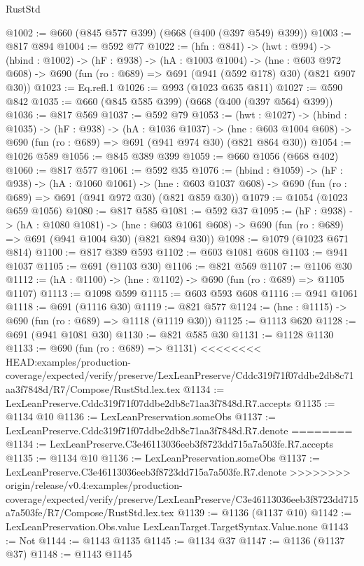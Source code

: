 \begin{lexlean}{RustStd}
\begin{coremodule}
{\begin{coremodule}
@1002 := @660 (@845 @577 @399) (@668 (@400 (@397 @549) @399))
@1003 := @817 @894
@1004 := @592 @77
@1022 := (hfn : @841) ->
  (hwt : @994) ->
  (hbind : @1002) ->
  (hF : @938) ->
  (hA : @1003 @1004) ->
  (hne : @603 @972 @608) -> @690 (fun (ro : @689) => @691 (@941 (@592 @178) @30) (@821 @907 @30))
@1023 := Eq.refl.{1}
@1026 := @993 (@1023 @635 @811)
@1027 := @590 @842
@1035 := @660 (@845 @585 @399) (@668 (@400 (@397 @564) @399))
@1036 := @817 @569
@1037 := @592 @79
@1053 := (hwt : @1027) ->
  (hbind : @1035) ->
  (hF : @938) ->
  (hA : @1036 @1037) ->
  (hne : @603 @1004 @608) -> @690 (fun (ro : @689) => @691 (@941 @974 @30) (@821 @864 @30))
@1054 := @1026 @589
@1056 := @845 @389 @399
@1059 := @660 @1056 (@668 @402)
@1060 := @817 @577
@1061 := @592 @35
@1076 := (hbind : @1059) ->
  (hF : @938) ->
  (hA : @1060 @1061) ->
  (hne : @603 @1037 @608) -> @690 (fun (ro : @689) => @691 (@941 @972 @30) (@821 @859 @30))
@1079 := @1054 (@1023 @659 @1056)
@1080 := @817 @585
@1081 := @592 @37
@1095 := (hF : @938) ->
  (hA : @1080 @1081) ->
  (hne : @603 @1061 @608) -> @690 (fun (ro : @689) => @691 (@941 @1004 @30) (@821 @894 @30))
@1098 := @1079 (@1023 @671 @814)
@1100 := @817 @389 @593
@1102 := @603 @1081 @608
@1103 := @941 @1037
@1105 := @691 (@1103 @30)
@1106 := @821 @569
@1107 := @1106 @30
@1112 := (hA : @1100) -> (hne : @1102) -> @690 (fun (ro : @689) => @1105 @1107)
@1113 := @1098 @599
@1115 := @603 @593 @608
@1116 := @941 @1061
@1118 := @691 (@1116 @30)
@1119 := @821 @577
@1124 := (hne : @1115) -> @690 (fun (ro : @689) => @1118 (@1119 @30))
@1125 := @1113 @620
@1128 := @691 (@941 @1081 @30)
@1130 := @821 @585 @30
@1131 := @1128 @1130
@1133 := @690 (fun (ro : @689) => @1131)
<<<<<<<< HEAD:examples/production-coverage/expected/verify/preserve/LexLeanPreserve/Cddc319f71f07ddbe2db8c71aa3f7848d/R7/Compose/RustStd.lex.tex
@1134 := LexLeanPreserve.Cddc319f71f07ddbe2db8c71aa3f7848d.R7.accepts
@1135 := @1134 @10
@1136 := LexLeanPreservation.someObs
@1137 := LexLeanPreserve.Cddc319f71f07ddbe2db8c71aa3f7848d.R7.denote
========
@1134 := LexLeanPreserve.C3e46113036eeb3f8723dd715a7a503fe.R7.accepts
@1135 := @1134 @10
@1136 := LexLeanPreservation.someObs
@1137 := LexLeanPreserve.C3e46113036eeb3f8723dd715a7a503fe.R7.denote
>>>>>>>> origin/release/v0.4:examples/production-coverage/expected/verify/preserve/LexLeanPreserve/C3e46113036eeb3f8723dd715a7a503fe/R7/Compose/RustStd.lex.tex
@1139 := @1136 (@1137 @10)
@1142 := LexLeanPreservation.Obs.value LexLeanTarget.TargetSyntax.Value.none
@1143 := Not
@1144 := @1143 @1135
@1145 := @1134 @37
@1147 := @1136 (@1137 @37)
@1148 := @1143 @1145

\end{coremodule}}
\end{coremodule}
\end{lexlean}

